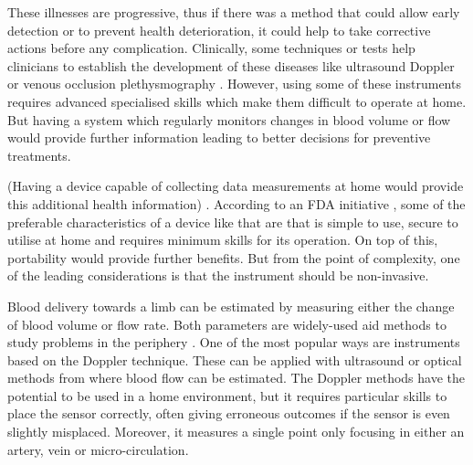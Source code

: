 These illnesses are progressive, thus if there was a method that could allow early detection or to prevent health deterioration, it could help to take corrective actions before any complication. Clinically, some techniques or tests help clinicians to establish the development of these diseases like ultrasound Doppler \cite{casey2008measuring} or venous occlusion plethysmography \cite{wilkinson2001venous}. However, using some of these instruments requires advanced specialised skills which make them difficult to operate at home. But having a system which regularly monitors changes in blood volume or flow would provide further information leading to better decisions for preventive treatments. 

(Having a device capable of collecting data measurements at home would provide this additional health information) . According to an FDA initiative \cite{fdaini}, some of the preferable characteristics of a device like that are that is simple to use, secure to utilise at home and requires minimum skills for its operation. On top of this, portability would provide further benefits. But from the point of complexity, one of the leading considerations is that the instrument should be non-invasive. 

Blood delivery towards a limb can be estimated by measuring either the change of blood volume or flow rate. Both parameters are widely-used aid methods to study problems in the periphery . One of the most popular ways are instruments based on the Doppler technique. These can be applied with ultrasound \cite{orekhova2013doppler} or optical \cite{fredriksson2007laser} methods from where blood flow can be estimated. The Doppler methods have the potential to be used in a home environment, but it requires particular skills to place the sensor correctly, often giving erroneous outcomes if the sensor is even slightly misplaced. Moreover, it measures a single point only focusing in either an artery, vein or micro-circulation. 

